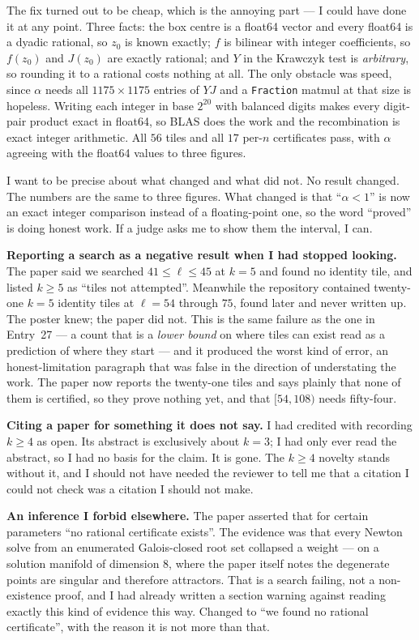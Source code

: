 \documentclass[12pt]{article}
\begin{document}
The fix turned out to be cheap, which is the annoying part --- I could have done
it at any point. Three facts: the box centre is a float64 vector and every
float64 is a dyadic rational, so $z_0$ is known exactly; $f$ is bilinear with
integer coefficients, so $f(z_0)$ and $J(z_0)$ are exactly rational; and $Y$ in
the Krawczyk test is \emph{arbitrary}, so rounding it to a rational costs
nothing at all. The only obstacle was speed, since $\alpha$ needs all
$1175\times1175$ entries of $YJ$ and a \texttt{Fraction} matmul at that size is
hopeless. Writing each integer in base $2^{20}$ with balanced digits makes every
digit-pair product exact in float64, so BLAS does the work and the recombination
is exact integer arithmetic. All $56$ tiles and all $17$ per-$n$ certificates
pass, with $\alpha$ agreeing with the float64 values to three figures.

I want to be precise about what changed and what did not. No result changed. The
numbers are the same to three figures. What changed is that ``$\alpha<1$'' is now
an exact integer comparison instead of a floating-point one, so the word
``proved'' is doing honest work. If a judge asks me to show them the interval,
I can.

\textbf{Reporting a search as a negative result when I had stopped looking.} The
paper said we searched $41\le\ell\le45$ at $k=5$ and found no identity tile, and
listed $k\ge5$ as ``tiles not attempted''. Meanwhile the repository contained
twenty-one $k=5$ identity tiles at $\ell=54$ through $75$, found later and never
written up. The poster knew; the paper did not. This is the same failure as the
one in Entry~27 --- a count that is a \emph{lower bound} on where tiles can exist
read as a prediction of where they start --- and it produced the worst kind of
error, an honest-limitation paragraph that was false in the direction of
understating the work. The paper now reports the twenty-one tiles and says
plainly that none of them is certified, so they prove nothing yet, and that
$[54,108)$ needs fifty-four.

\textbf{Citing a paper for something it does not say.} I had credited
\cite{K} with recording $k\ge4$ as open. Its abstract is exclusively about
$k=3$; I had only ever read the abstract, so I had no basis for the claim. It is
gone. The $k\ge4$ novelty stands without it, and I should not have needed the
reviewer to tell me that a citation I could not check was a citation I should
not make.

\textbf{An inference I forbid elsewhere.} The paper asserted that for certain
parameters ``no rational certificate exists''. The evidence was that every
Newton solve from an enumerated Galois-closed root set collapsed a weight --- on
a solution manifold of dimension $8$, where the paper itself notes the
degenerate points are singular and therefore attractors. That is a search
failing, not a non-existence proof, and I had already written a section warning
against reading exactly this kind of evidence this way. Changed to ``we found
no rational certificate'', with the reason it is not more than that.
\end{document}
